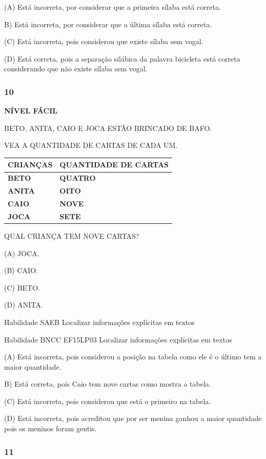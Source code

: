 (A) Está incorreta, por considerar que a primeira sílaba está correta.

B) Está incorreta, por considerar que a última sílaba está correta.

(C) Está incorreta, pois considerou que existe sílaba sem vogal.

(D) Está correta, pois a separação silábica da palavra bicicleta está
correta considerando que não existe sílaba sem vogal.

\subsubsection{10}\label{section-152}

\textbf{NÍVEL FÁCIL}

BETO, ANITA, CAIO E JOCA ESTÃO BRINCADO DE BAFO.

VEA A QUANTIDADE DE CARTAS DE CADA UM.

\begin{longtable}[]{@{}ll@{}}
\toprule
\textbf{CRIANÇAS} & \textbf{QUANTIDADE DE CARTAS}\tabularnewline
\midrule
\endhead
\textbf{BETO} & \textbf{QUATRO}\tabularnewline
\textbf{ANITA} & \textbf{OITO}\tabularnewline
\textbf{CAIO} & \textbf{NOVE}\tabularnewline
\textbf{JOCA} & \textbf{SETE}\tabularnewline
\bottomrule
\end{longtable}

QUAL CRIANÇA TEM NOVE CARTAS?

(A) JOCA.

(B) CAIO.

(C) BETO.

(D) ANITA.

Habilidade SAEB Localizar informações explícitas em textos

Habilidade BNCC EF15LP03 Localizar informações explícitas em textos

(A) Está incorreta, pois considerou a posição na tabela como ele é o
último tem a maior quantidade.

B) Está correta, pois Caio tem nove cartas como mostra a tabela.

(C) Está incorreta, pois considerou que está o primeiro na tabela.

(D) Está incorreta, pois acreditou que por ser menina ganhou a maior
quantidade pois os meninos foram gentis.

\subsubsection{11}\label{section-153}

